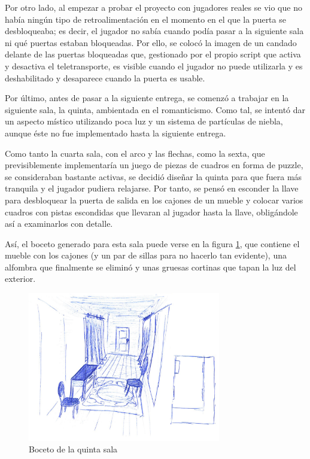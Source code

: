 Por otro lado, al empezar a probar el proyecto con jugadores reales se vio que no había ningún tipo de retroalimentación en el momento en el que la puerta se desbloqueaba; es decir, el jugador no sabía cuando podía pasar a la siguiente sala ni qué puertas estaban bloqueadas. Por ello, se colocó la imagen de un candado delante de las puertas bloqueadas que, gestionado por el propio script que activa y desactiva el teletransporte, es visible cuando el jugador no puede utilizarla y es deshabilitado y desaparece cuando la puerta es usable.

Por último, antes de pasar a la siguiente entrega, se comenzó a trabajar en la siguiente sala, la quinta, ambientada en el romanticismo. Como tal, se intentó dar un aspecto místico utilizando poca luz y un sistema de partículas de niebla, aunque éste no fue implementado hasta la siguiente entrega.

Como tanto la cuarta sala, con el arco y las flechas, como la sexta, que previsiblemente implementaría un juego de piezas de cuadros en forma de puzzle, se consideraban bastante activas, se decidió diseñar la quinta para que fuera más tranquila y el jugador pudiera relajarse. Por tanto, se pensó en esconder la llave para desbloquear la puerta de salida en los cajones de un mueble y colocar varios cuadros con pistas escondidas que llevaran al jugador hasta la llave, obligándole así a examinarlos con detalle.

Así, el boceto generado para esta sala puede verse en la figura \ref{fig:boceto-sala-5}, que contiene el mueble con los cajones (y un par de sillas para no hacerlo tan evidente), una alfombra que finalmente se eliminó y unas gruesas cortinas que tapan la luz del exterior.

\begin{figure}[!h]
\begin{center}
\includegraphics[width=0.75\textwidth]{imagenes/7/bocetos/boceto-sala-5.png}
\caption{Boceto de la quinta sala}
\label{fig:boceto-sala-5}
\end{center}
\end{figure}


